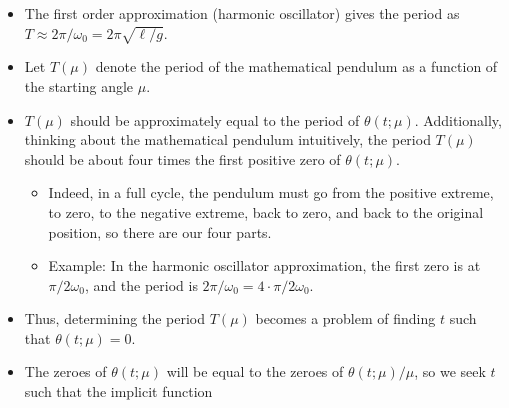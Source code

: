 \documentclass[../notes.tex]{subfiles}
\begin{document}
\begin{itemize}
\begin{itemize}
        \item The first order approximation (harmonic oscillator) gives the period as $T\approx 2\pi/\omega_0=2\pi\sqrt{\ell/g}$.
        \item Let $T(\mu)$ denote the period of the mathematical pendulum as a function of the starting angle $\mu$.
        \item $T(\mu)$ should be approximately equal to the period of $\theta(t;\mu)$. Additionally, thinking about the mathematical pendulum intuitively, the period $T(\mu)$ should be about four times the first positive zero of $\theta(t;\mu)$.
        \begin{itemize}
            \item Indeed, in a full cycle, the pendulum must go from the positive extreme, to zero, to the negative extreme, back to zero, and back to the original position, so there are our four parts.
            \item Example: In the harmonic oscillator approximation, the first zero is at $\pi/2\omega_0$, and the period is $2\pi/\omega_0=4\cdot\pi/2\omega_0$.
        \end{itemize}
        \item Thus, determining the period $T(\mu)$ becomes a problem of finding $t$ such that $\theta(t;\mu)=0$.
        \item The zeroes of $\theta(t;\mu)$ will be equal to the zeroes of $\theta(t;\mu)/\mu$, so we seek $t$ such that the implicit function

\end{itemize}
\end{itemize}
\end{document}
